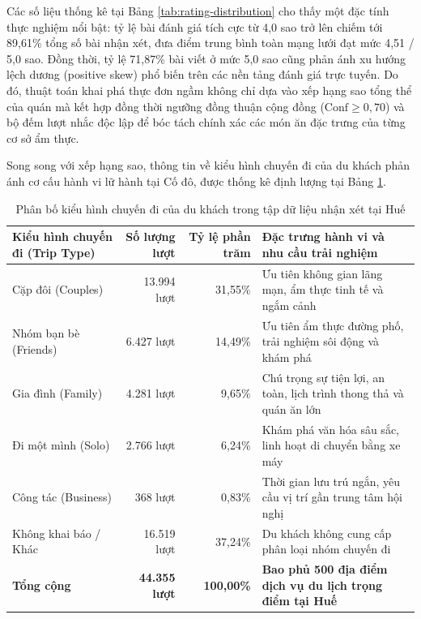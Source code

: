 Các số liệu thống kê tại Bảng \ref{tab:rating-distribution} cho thấy một đặc tính thực nghiệm nổi bật: tỷ lệ bài đánh giá tích cực từ 4,0 sao trở lên chiếm tới 89,61\% tổng số bài nhận xét, đưa điểm trung bình toàn mạng lưới đạt mức 4,51 / 5,0 sao. Đồng thời, tỷ lệ 71,87\% bài viết ở mức 5,0 sao cũng phản ánh xu hướng lệch dương (positive skew) phổ biến trên các nền tảng đánh giá trực tuyến. Do đó, thuật toán khai phá thực đơn ngầm không chỉ dựa vào xếp hạng sao tổng thể của quán mà kết hợp đồng thời ngưỡng đồng thuận cộng đồng ($\text{Conf} \ge 0{,}70$) và bộ đếm lượt nhắc độc lập để bóc tách chính xác các món ăn đặc trưng của từng cơ sở ẩm thực.

Song song với xếp hạng sao, thông tin về kiểu hình chuyến đi của du khách phản ánh cơ cấu hành vi lữ hành tại Cố đô, được thống kê định lượng tại Bảng \ref{tab:trip-type-distribution}.

\begin{table}[htbp]
\centering
\caption{Phân bố kiểu hình chuyến đi của du khách trong tập dữ liệu nhận xét tại Huế}
\label{tab:trip-type-distribution}
\small
\begin{tabularx}{\textwidth}{l r r X}
\hline
\textbf{Kiểu hình chuyến đi (Trip Type)} & \textbf{Số lượng lượt} & \textbf{Tỷ lệ phần trăm} & \textbf{Đặc trưng hành vi và nhu cầu trải nghiệm} \\
\hline
Cặp đôi (Couples) & 13.994 lượt & 31,55\% & Ưu tiên không gian lãng mạn, ẩm thực tinh tế và ngắm cảnh \\
Nhóm bạn bè (Friends) & 6.427 lượt & 14,49\% & Ưu tiên ẩm thực đường phố, trải nghiệm sôi động và khám phá \\
Gia đình (Family) & 4.281 lượt & 9,65\% & Chú trọng sự tiện lợi, an toàn, lịch trình thong thả và quán ăn lớn \\
Đi một mình (Solo) & 2.766 lượt & 6,24\% & Khám phá văn hóa sâu sắc, linh hoạt di chuyển bằng xe máy \\
Công tác (Business) & 368 lượt & 0,83\% & Thời gian lưu trú ngắn, yêu cầu vị trí gần trung tâm hội nghị \\
Không khai báo / Khác & 16.519 lượt & 37,24\% & Du khách không cung cấp phân loại nhóm chuyến đi \\
\hline
\textbf{Tổng cộng} & \textbf{44.355 lượt} & \textbf{100,00\%} & \textbf{Bao phủ 500 địa điểm dịch vụ du lịch trọng điểm tại Huế} \\
\hline
\end{tabularx}
\end{table}

